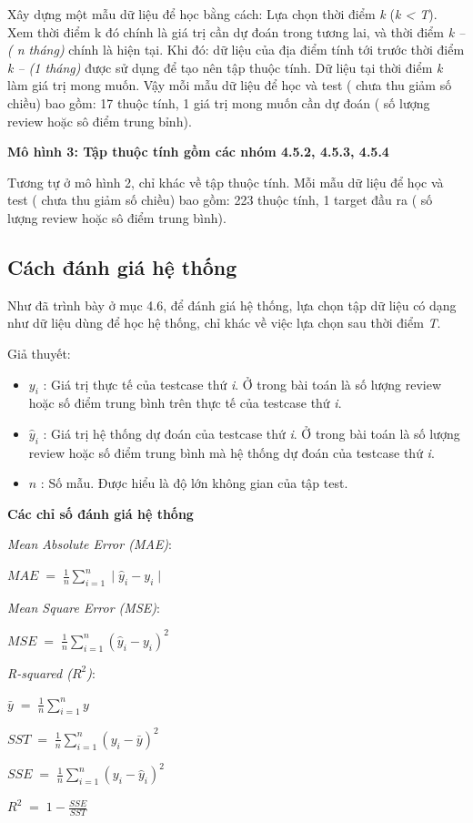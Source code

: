 \documentclass[12pt]{extarticle}
\begin{document}
			\par Xây dựng một mẫu dữ liệu để học bằng cách: Lựa chọn thời điểm \textit{k} (\textit{k < T}). Xem thời điểm k đó chính là giá trị cần dự đoán trong tương lai, và  thời điểm \textit{k – ( n tháng)} chính là hiện tại. Khi đó: dữ liệu của địa điểm tính tới trước thời điểm \textit{k – (1 tháng)} được sử dụng để tạo nên tập thuộc tính. Dữ liệu tại thời điểm \textit{k} làm giá trị mong muốn. Vậy mỗi mẫu dữ liệu để học và test ( chưa thu giảm số chiều) bao gồm: 17 thuộc tính, 1 giá trị mong muốn cần dự đoán ( số lượng review hoặc sô điểm trung bỉnh).
			\par \textbf{Mô hình 3: Tập thuộc tính gồm các nhóm 4.5.2, 4.5.3, 4.5.4}
			\par Tương tự ở mô hình 2, chỉ khác về tập thuộc tính. Mỗi mẫu dữ liệu để học và test ( chưa thu giảm số chiều) bao gồm: 223 thuộc tính, 1 target đầu ra ( số lượng review hoặc sô điểm trung bình).
		\subsection{Cách đánh giá hệ thống}
			\par Như đã trình bày ở mục 4.6, để đánh giá hệ thống, lựa chọn tập dữ liệu có dạng như dữ liệu dùng để học hệ thống, chỉ khác về việc lựa chọn sau thời điểm \textit{T}.
			\par Giả thuyết:
			 \begin{itemize}
				\item $y_{i}$ : Giá trị thực tế của testcase thứ  \textit{i}. Ở trong bài toán là số lượng review hoặc số điểm trung bình trên thực tế của testcase thứ  \textit{i}.
				\item $\hat{y}_{i}$ : Giá trị hệ thống dự đoán của testcase thứ  \textit{i}. Ở trong bài toán là số lượng review hoặc số điểm trung bình mà hệ thống dự đoán của testcase thứ  \textit{i}.
				\item $n$ : Số mẫu. Được hiểu là độ lớn không gian của tập test.
			\end{itemize}
			\par \textbf{Các chỉ số đánh giá hệ thống}
			\par \textit{Mean Absolute Error (MAE)}: 
				\large
				\begin{center}
					$MAE\;=\;\frac{1}{n}\sum_{i=1}^n\mid \hat{y}_{i}-y_{i}\mid$
				\end{center}
				\normalsize
			\par \textit{Mean Square Error (MSE)}:
				\large
				\begin{center}
					$MSE\;=\;\frac{1}{n}\sum_{i=1}^n(\hat{y}_{i}-y_{i})^{2}$
				\end{center}
				\normalsize
			\par \textit{R-squared ($R^{2}$)}:
				\large
				\begin{center}
					\par $\bar{y}\;=\;\frac{1}{n}\sum_{i=1}^ny$
					\par $SST\;=\;\frac{1}{n}\sum_{i=1}^n(y_{i}-\bar{y})^{2}$
					\par $SSE\;=\;\frac{1}{n}\sum_{i=1}^n(y_{i}-\hat{y}_{i})^{2}$
					\par $R^{2}\;=\;1-\frac{SSE}{SST}$
				\end{center}
				\normalsize
\end{document}
